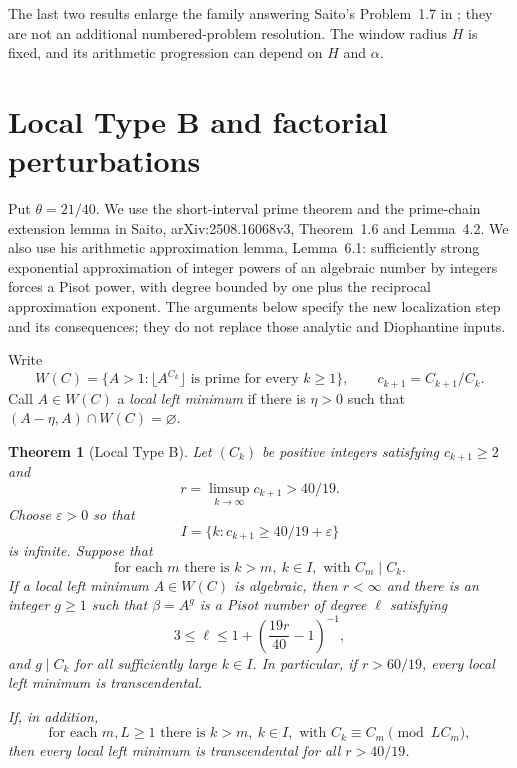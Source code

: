 \documentclass[11pt,a4paper]{article}
\newtheorem{theorem}{Theorem}[section]
\theoremstyle{definition}
\theoremstyle{remark}
\numberwithin{equation}{section}
\begin{document}
The last two results enlarge the family answering Saito's
Problem~1.7 in \cite{SaitoIntervals}; they are not an additional
numbered-problem resolution. The window radius $H$ is fixed, and its
arithmetic progression can depend on $H$ and $\alpha$.


\section{Local Type B and factorial perturbations}
\label{mil:sec:factorial-local}

Put $\theta=21/40$. We use the short-interval prime theorem and the prime-chain extension lemma in Saito, arXiv:2508.16068v3, Theorem~1.6 and Lemma~4.2. We also use his arithmetic approximation lemma, Lemma~6.1: sufficiently strong exponential approximation of integer powers of an algebraic number by integers forces a Pisot power, with degree bounded by one plus the reciprocal approximation exponent. The arguments below specify the new localization step and its consequences; they do not replace those analytic and Diophantine inputs.

Write
\[
 W(C)=\{A>1:\lfloor A^{C_k}\rfloor\text{ is prime for every }k\geq1\},
 \qquad c_{k+1}=C_{k+1}/C_k.
\]
Call $A\in W(C)$ a \emph{local left minimum} if there is $\eta>0$ such that $(A-\eta,A)\cap W(C)=\varnothing$.

\begin{theorem}[Local Type B]
\label{mil:thm:local-type-b}
Let $(C_k)$ be positive integers satisfying $c_{k+1}\geq2$ and
\[
 r=\limsup_{k\to\infty}c_{k+1}>40/19.
\]
Choose $\varepsilon>0$ so that
\[
 I=\{k:c_{k+1}\geq40/19+\varepsilon\}
\]
is infinite. Suppose that
\begin{equation}
 \text{for each }m\text{ there is }k>m,\ k\in I,
 \text{ with }C_m\mid C_k.\label{mil:eq:local-b5}
\end{equation}
If a local left minimum $A\in W(C)$ is algebraic, then $r<\infty$ and there is an integer $g\geq1$ such that $\beta=A^g$ is a Pisot number of degree $\ell$ satisfying
\[
 3\leq\ell\leq1+\left(\frac{19r}{40}-1\right)^{-1},
\]
and $g\mid C_k$ for all sufficiently large $k\in I$. In particular, if $r>60/19$, every local left minimum is transcendental.

If, in addition,
\begin{equation}
 \text{for each }m,L\geq1\text{ there is }k>m,\ k\in I,
 \text{ with }C_k\equiv C_m\pmod{LC_m},\label{mil:eq:local-b6}
\end{equation}
then every local left minimum is transcendental for all $r>40/19$.
\end{theorem}
\end{document}
